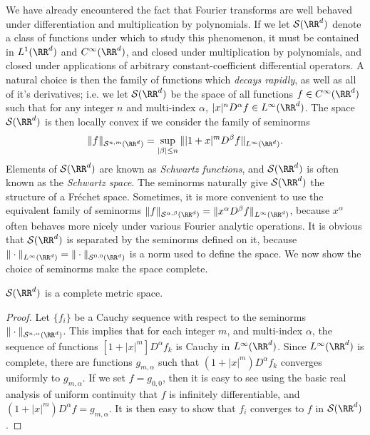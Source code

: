 We have already encountered the fact that Fourier transforms are well behaved under differentiation and multiplication by polynomials. If we let $\mathcal{S}(\RR^d)$ denote a class of functions under which to study this phenomenon, it must be contained in $L^1(\RR^d)$ and $C^\infty(\RR^d)$, and closed under multiplication by polynomials, and closed under applications of arbitrary constant-coefficient differential operators. A natural choice is then the family of functions which \emph{decays rapidly}, as well as all of it's derivatives; i.e. we let $\mathcal{S}(\RR^d)$ be the space of all functions $f \in C^\infty(\RR^d)$ such that for any integer $n$ and multi-index $\alpha$, $|x|^n D^\alpha f \in L^\infty(\RR^d)$. The space $\mathcal{S}(\RR^d)$ is then locally convex if we consider the family of seminorms
%
\[ \| f \|_{\mathcal{S}^{n,m}(\RR^d)} = \sup_{|\beta| \leq n} \| |1+x|^m D^\beta f \|_{L^\infty(\RR^d)}. \]
%
Elements of $\mathcal{S}(\RR^d)$ are known as \emph{Schwartz functions}, and $\mathcal{S}(\RR^d)$ is often known as the \emph{Schwartz space}. The seminorms naturally give $\mathcal{S}(\RR^d)$ the structure of a Fr\'{e}chet space. Sometimes, it is more convenient to use the equivalent family of seminorms $\| f \|_{\mathcal{S}^{\alpha, \beta}(\RR^d)} = \| x^\alpha D^\beta f \|_{L^\infty(\RR^d)}$, because $x^\alpha$ often behaves more nicely under various Fourier analytic operations. It is obvious that $\mathcal{S}(\RR^d)$ is separated by the seminorms defined on it, because $\| \cdot \|_{L^\infty(\RR^d)} = \| \cdot \|_{\mathcal{S}^{0,0}(\RR^d)}$ is a norm used to define the space. We now show the choice of seminorms make the space complete.

\begin{theorem}
    $\mathcal{S}(\RR^d)$ is a complete metric space.
\end{theorem}
\begin{proof}
    Let $\{ f_i \}$ be a Cauchy sequence with respect to the seminorms $\| \cdot \|_{\mathcal{S}^{n,\alpha}(\RR^d)}$. This implies that for each integer $m$, and multi-index $\alpha$, the sequence of functions $[1 + |x|^m] D^\alpha f_k$ is Cauchy in $L^\infty(\RR^d)$. Since $L^\infty(\RR^d)$ is complete, there are functions $g_{m,\alpha}$ such that $(1 + |x|^m) D^\alpha f_k$ converges uniformly to $g_{m,\alpha}$. If we set $f = g_{0,0}$, then it is easy to see using the basic real analysis of uniform continuity that $f$ is infinitely differentiable, and $(1 + |x|^m) D^\alpha f = g_{m,\alpha}$. It is then easy to show that $f_i$ converges to $f$ in $\mathcal{S}(\RR^d)$.
\end{proof}

